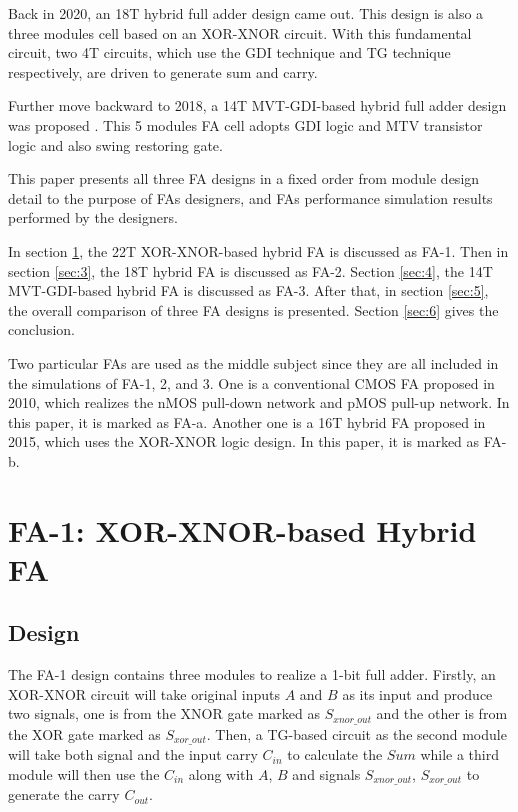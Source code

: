 \documentclass[conference]{IEEEtran}
\begin{document}
Back in 2020, an 18T hybrid full adder design \cite{9339799} came out.
This design is also a three modules cell based on an XOR-XNOR circuit.
With this fundamental circuit, two 4T circuits, which use the GDI technique and TG technique respectively, are driven to generate sum and carry.

Further move backward to 2018, a 14T MVT-GDI-based hybrid full adder design was proposed \cite{18743001}.
This 5 modules FA cell adopts GDI logic and MTV transistor logic and also swing restoring gate.

This paper presents all three FA designs in a fixed order
from module design detail to the purpose of FAs designers, and FAs performance simulation results performed by the designers.

In section \ref{sec:2}, the 22T XOR-XNOR-based hybrid FA is discussed as FA-1.
Then in section \ref{sec:3}, the 18T hybrid FA is discussed as FA-2.
Section \ref{sec:4}, the 14T MVT-GDI-based hybrid FA is discussed as FA-3.
After that, in section \ref{sec:5}, the overall comparison of three FA designs is presented.
Section \ref{sec:6} gives the conclusion.

Two particular FAs are used as the middle subject since they are all included in the simulations of FA-1, 2, and 3.
One is a conventional CMOS FA proposed in 2010\cite{weste2010cmos}, which realizes the nMOS pull-down network and pMOS pull-up network.
In this paper, it is marked as FA-a.
Another one is a 16T hybrid FA proposed in 2015\cite{15484823}, which uses the XOR-XNOR logic design.
In this paper, it is marked as FA-b.


\section{FA-1: XOR-XNOR-based Hybrid FA}
\label{sec:2}

\subsection{Design}

The FA-1 \cite{20212210429416} design contains three modules to realize a 1-bit full adder.
Firstly, an XOR-XNOR circuit will take original inputs \(A\) and \(B\) as its input and produce two signals,
one is from the XNOR gate marked as \(S_{xnor\_out}\) and the other is from the XOR gate marked as \( S_{xor\_out}\).
Then, a TG-based circuit as the second module will take both signal and the input carry \(C_{in}\) to calculate the \(Sum\)
while a third module will then use the \(C_{in}\) along with \(A\), \(B\) and signals \(S_{xnor\_out}\), \( S_{xor\_out}\) to generate the carry \(C_{out}\).
\end{document}
